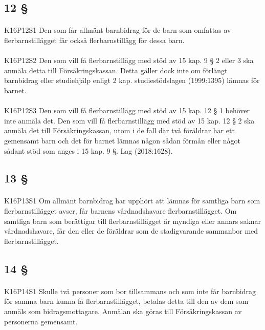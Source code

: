 \documentclass[a4paper,notitlepage,openany,10pt]{book}
\begin{document}
\subsection*{12 §}
\paragraph*{}
{\tiny K16P12S1}
Den som får allmänt barnbidrag för de barn som omfattas av flerbarnstillägget får också flerbarnstillägg för dessa barn.
\paragraph*{}
{\tiny K16P12S2}
Den som vill få flerbarnstillägg med stöd av 15 kap. 9 § 2 eller 3 ska anmäla detta till Försäkringskassan. Detta gäller dock inte om förlängt barnbidrag eller studiehjälp enligt 2 kap. studiestödslagen (1999:1395) lämnas för barnet.
\paragraph*{}
{\tiny K16P12S3}
Den som vill få flerbarnstillägg med stöd av 15 kap. 12 § 1 behöver inte anmäla det. Den som vill få flerbarnstillägg med stöd av 15 kap. 12 § 2 ska anmäla det till Försäkringskassan, utom i de fall där två föräldrar har ett gemensamt barn och det för barnet lämnas någon sådan förmån eller något sådant stöd som anges i 15 kap. 9 §.
Lag (2018:1628).
\subsection*{13 §}
\paragraph*{}
{\tiny K16P13S1}
Om allmänt barnbidrag har upphört att lämnas för samtliga barn som flerbarnstillägget avser, får barnens vårdnadshavare flerbarnstillägget. Om samtliga barn som berättigar till flerbarnstillägget är myndiga eller annars saknar vårdnadshavare, får den eller de föräldrar som de stadigvarande sammanbor med flerbarnstillägget.
\subsection*{14 §}
\paragraph*{}
{\tiny K16P14S1}
Skulle två personer som bor tillsammans och som inte får barnbidrag för samma barn kunna få flerbarnstillägget, betalas detta till den av dem som anmäls som bidragsmottagare. Anmälan ska göras till Försäkringskassan av personerna gemensamt.
\end{document}

